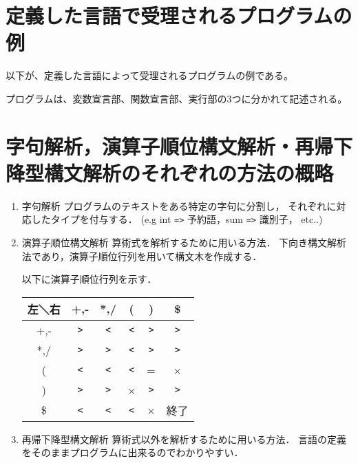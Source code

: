 \documentclass[11pt,a4j]{jarticle}
\begin{document}

\section{定義した言語で受理されるプログラムの例}


以下が、定義した言語によって受理されるプログラムの例である。




プログラムは、変数宣言部、関数宣言部、実行部の3つに分かれて記述される。

\newpage




\section{字句解析，演算子順位構文解析・再帰下降型構文解析のそれぞれの方法の概略}

\begin{enumerate}
\item{字句解析}
プログラムのテキストをある特定の字句に分割し，
それぞれに対応したタイプを付与する．
(e.g int \verb|=>| 予約語，sum \verb|=>| 識別子， etc..)

\item{演算子順位構文解析}
算術式を解析するために用いる方法．
下向き構文解析法であり，演算子順位行列を用いて構文木を作成する．

以下に演算子順位行列を示す．
\begin{table}[h]
\centering
\begin{tabular}{|c|c|c|c|c|c|}\hline
左＼右 & +,- & *,/ & ( & ) & \$\\ \hline
+,- & \verb|>| & \verb|<| & \verb|<| & \verb|>| & \verb|>| \\ \hline
*,/ & \verb|>| & \verb|>| & \verb|<| & \verb|>| & \verb|>| \\ \hline
( & \verb|<| & \verb|<| & \verb|<| & = & × \\ \hline
) & \verb|>| & \verb|>| & × & \verb|>| & \verb|>| \\ \hline
\$ & \verb|<| & \verb|<| & \verb|<| & × & 終了 \\ \hline
\end{tabular}
\end{table}

\item{再帰下降型構文解析}
算術式以外を解析するために用いる方法．
言語の定義をそのままプログラムに出来るのでわかりやすい．

\end{enumerate}
\end{document}

